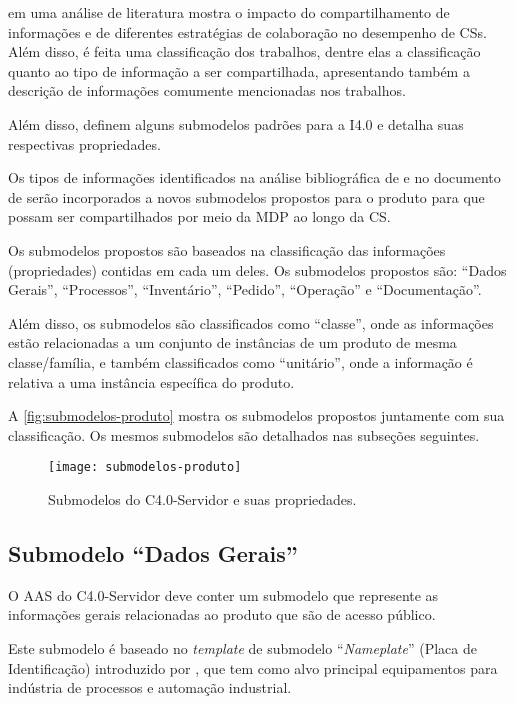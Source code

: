  em uma análise de literatura mostra o impacto do compartilhamento de informações e de diferentes estratégias de colaboração no desempenho de CSs. Além disso, é feita uma classificação dos trabalhos, dentre elas a classificação quanto ao tipo de informação a ser compartilhada, apresentando também a descrição de informações comumente mencionadas nos trabalhos.

Além disso,  definem alguns submodelos padrões para a I4.0 e detalha suas respectivas propriedades.

Os tipos de informações identificados na análise bibliográfica de  e no documento de  serão incorporados a novos submodelos propostos para o produto para que possam ser compartilhados por meio da MDP ao longo da CS.

Os submodelos propostos são baseados na classificação das informações (propriedades) contidas em cada um deles. Os submodelos propostos são: ``Dados Gerais'', ``Processos'', ``Inventário'', ``Pedido'', ``Operação'' e ``Documentação''.

Além disso, os submodelos são classificados como ``classe'', onde as informações estão relacionadas a um conjunto de instâncias de um produto de mesma classe/família, e também classificados como ``unitário'', onde a informação é relativa a uma instância específica do produto.

A \autoref{fig:submodelos-produto} mostra os submodelos propostos juntamente com sua classificação. Os mesmos submodelos são detalhados nas subseções seguintes.

\begin{figure}[t]
	\centering
	\texttt{[image: submodelos-produto]}
	\caption{Submodelos do C4.0-Servidor e suas propriedades.}
	\label{fig:submodelos-produto}
\end{figure}

\subsection{Submodelo ``Dados Gerais''}

O AAS do C4.0-Servidor deve conter um submodelo que represente as informações gerais relacionadas ao produto que são de acesso público.

Este submodelo é baseado no \textit{template} de submodelo ``\textit{Nameplate}'' (Placa de Identificação) introduzido por , que tem como alvo principal equipamentos para indústria de processos e automação industrial.

